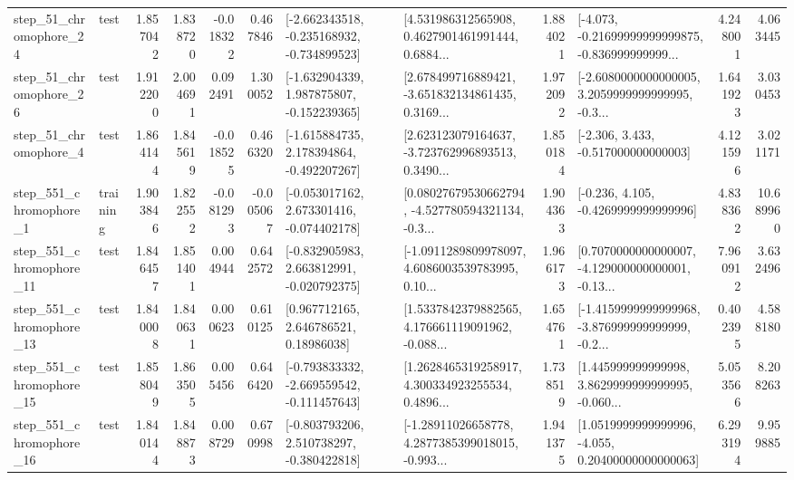 \begin{tabular}{llrrrrllrlrr}
   step\_51\_chromophore\_24 &      test &      1.857042 &    1.838720 &     -0.018322 &  0.467846 &  [-2.662343518, -0.235168932, -0.734899523] &  [4.531986312565908, 0.4627901461991444, 0.6884... &       1.884021 &  [-4.073, -0.21699999999999875, -0.836999999999... &            4.248001 &          4.063445 \\
   step\_51\_chromophore\_26 &      test &      1.912200 &    2.004691 &      0.092491 &  1.300052 &   [-1.632904339, 1.987875807, -0.152239365] &  [2.678499716889421, -3.651832134861435, 0.3169... &       1.972092 &  [-2.6080000000000005, 3.2059999999999995, -0.3... &            1.641923 &          3.030453 \\
    step\_51\_chromophore\_4 &      test &      1.864144 &    1.845619 &     -0.018525 &  0.466320 &   [-1.615884735, 2.178394864, -0.492207267] &  [2.623123079164637, -3.723762996893513, 0.3490... &       1.850184 &                [-2.306, 3.433, -0.517000000000003] &            4.121596 &          3.021171 \\
   step\_551\_chromophore\_1 &  training &      1.903846 &    1.822552 &     -0.081293 & -0.005067 &   [-0.053017162, 2.673301416, -0.074402178] &  [0.08027679530662794, -4.527780594321134, -0.3... &       1.904363 &               [-0.236, 4.105, -0.4269999999999996] &            4.838362 &         10.689960 \\
  step\_551\_chromophore\_11 &      test &      1.846457 &    1.851401 &      0.004944 &  0.642572 &   [-0.832905983, 2.663812991, -0.020792375] &  [-1.0911289809978097, 4.6086003539783995, 0.10... &       1.966173 &  [0.7070000000000007, -4.129000000000001, -0.13... &            7.960912 &          3.632496 \\
  step\_551\_chromophore\_13 &      test &      1.840008 &    1.840631 &      0.000623 &  0.610125 &      [0.967712165, 2.646786521, 0.18986038] &  [1.5337842379882565, 4.176661119091962, -0.088... &       1.654761 &  [-1.4159999999999968, -3.876999999999999, -0.2... &            0.402395 &          4.588180 \\
  step\_551\_chromophore\_15 &      test &      1.858049 &    1.863505 &      0.005456 &  0.646420 &  [-0.793833332, -2.669559542, -0.111457643] &  [1.2628465319258917, 4.300334923255534, 0.4896... &       1.738519 &  [1.445999999999998, 3.8629999999999995, -0.060... &            5.053566 &          8.208263 \\
  step\_551\_chromophore\_16 &      test &      1.840144 &    1.848873 &      0.008729 &  0.670998 &   [-0.803793206, 2.510738297, -0.380422818] &  [-1.28911026658778, 4.2877385399018015, -0.993... &       1.941375 &  [1.0519999999999996, -4.055, 0.20400000000000063] &            6.293194 &          9.959885 \\

\end{tabular}

